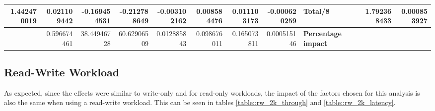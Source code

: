 \documentclass[11pt,a4paper]{article}
\begin{document}
{\begin{landscape}
{\begin{tabular}{|*{15}{r|}}
                \hline 1.442470019 & 0.021109442 & -0.169454531 & -0.212788649 & -0.003102162 & 0.008584476 & 0.011103173 & -0.000620259 & \multicolumn{3}{|l|}{\textbf{Total/8}} & \multicolumn{2}{|r|}{} & 1.792368433 & 0.000853927 \\
                \hline & 0.596674461 & 38.44946728 & 60.62906509 & 0.012885843 & 0.098676011 & 0.165073811 & 0.000515146 & \multicolumn{3}{|l|}{\textbf{Percentage impact}} & \multicolumn{4}{|l|}{} \\
                \hline
            \end{tabular}
        }
        \label{table::wo_2k_latency}

    \end{landscape}
    \clearpage%
}


\subsection{Read-Write Workload}
As expected, since the effects were similar to write-only and for read-only workloads, the impact of the factors chosen for this analysis is also the same when using a read-write workload. This can be seen in tables \ref{table::rw_2k_through} and \ref{table::rw_2k_latency}.
\end{document}
